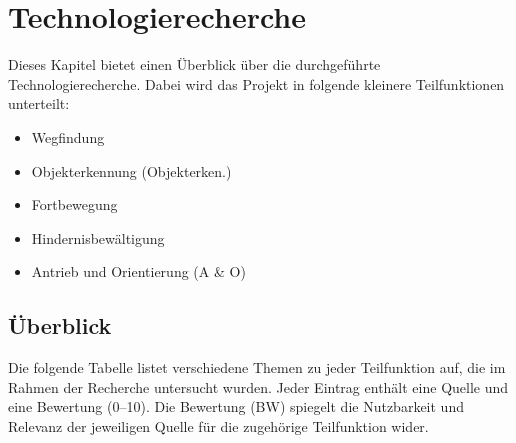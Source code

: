 \documentclass[../main.tex]{subfiles}
\begin{document}
\newpage
\section{Technologierecherche}\label{a2:technologierecherche}

Dieses Kapitel bietet einen Überblick über die durchgeführte Technologierecherche.
Dabei wird das Projekt in folgende kleinere Teilfunktionen unterteilt:
\begin{itemize}
    \item Wegfindung 
    \item Objekterkennung (Objekterken.)
    \item Fortbewegung
    \item Hindernisbewältigung
    \item Antrieb und Orientierung (A \& O)
\end{itemize}


\subsection{Überblick}
Die folgende Tabelle listet verschiedene Themen zu jeder Teilfunktion auf, die im Rahmen der Recherche untersucht wurden. Jeder Eintrag enthält eine Quelle und eine Bewertung (0–10). Die Bewertung (BW) spiegelt die Nutzbarkeit und Relevanz der jeweiligen Quelle für die zugehörige Teilfunktion wider.
\end{document}
